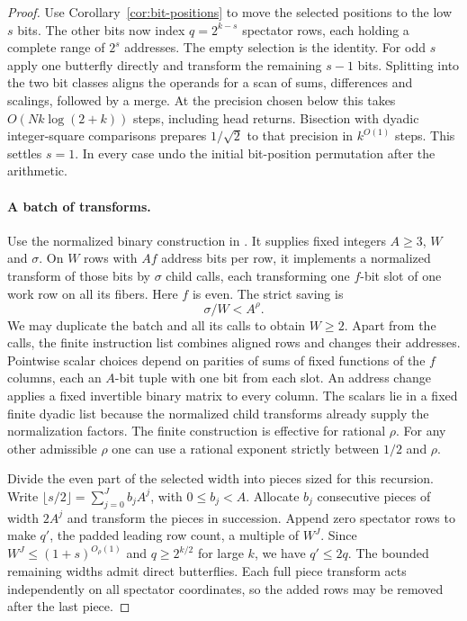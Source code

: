 \begin{proof}
Use Corollary~\ref{cor:bit-positions} to move the selected positions
to the low \(s\) bits. The other bits now index \(q=2^{k-s}\) spectator
rows, each holding a complete range of \(2^s\) addresses. The empty
selection is the identity. For odd \(s\) apply one butterfly directly
and transform the remaining \(s-1\) bits. Splitting into the two bit
classes aligns the operands for a scan of sums, differences and
scalings, followed by a merge. At the precision chosen below this
takes \(O(Nk\log(2+k))\) steps, including head returns. Bisection
with dyadic integer-square comparisons prepares \(1/\sqrt2\) to that
precision in \(k^{O(1)}\) steps. This settles \(s=1\). In every case
undo the initial bit-position permutation after the arithmetic.

\paragraph{A batch of transforms.}
Use the normalized binary construction in
\cite[Proposition~, Equation~()
and Section~]{oaF}. It supplies fixed integers
\(A\ge3\), \(W\) and \(\sigma\). On \(W\) rows with \(Af\) address
bits per row, it implements a normalized transform of those bits by
\(\sigma\) child calls, each transforming one \(f\)-bit slot of one
work row on all its fibers. Here \(f\) is even. The strict saving is
\[
                            \sigma/W<A^\rho .
\]
We may duplicate the batch and all its calls to obtain \(W\ge2\).
Apart from the calls, the finite instruction list combines aligned
rows and changes their addresses. Pointwise scalar choices depend on
parities of sums of fixed functions of the \(f\) columns, each an
\(A\)-bit tuple with one bit from each slot. An address change applies
a fixed invertible binary matrix to every column. The scalars lie
in a fixed finite dyadic list because the normalized child transforms
already supply the normalization factors. The finite construction is
effective for rational \(\rho\). For any other admissible \(\rho\)
one can use a rational exponent strictly between \(1/2\) and \(\rho\).

Divide the even part of the selected width into pieces sized for this
recursion. Write \(\lfloor s/2\rfloor=\sum_{j=0}^J b_jA^j\), with
\(0\le b_j<A\). Allocate \(b_j\) consecutive pieces of width \(2A^j\)
and transform the pieces in succession. Append zero spectator rows to
make \(q'\), the padded leading row count, a multiple of \(W^J\).
Since \(W^J\le(1+s)^{O_\rho(1)}\) and \(q\ge2^{k/2}\) for large \(k\),
we have \(q'\le2q\). The bounded remaining widths admit direct
butterflies. Each full piece transform acts independently on all
spectator coordinates, so the added rows may be removed after the
last piece.


\end{proof}
